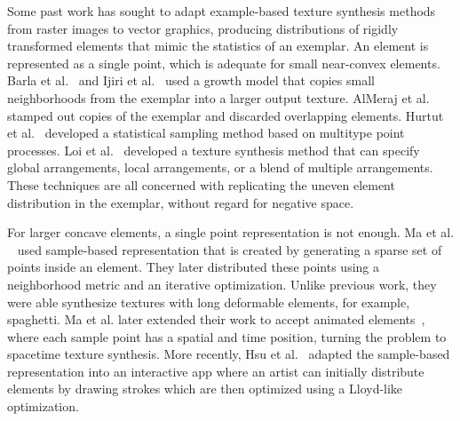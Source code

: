 \newtext
{
Some past work has sought to adapt example-based texture synthesis methods
from raster images to vector graphics, producing distributions of
rigidly transformed elements that mimic the statistics of an exemplar.
An element is represented as a single point, which is adequate for small near-convex elements.
Barla et al.~\cite{Barla2006} and Ijiri et al.~\cite{Ijiri2008} used a growth model that copies small neighborhoods
from the exemplar into a larger output texture.  AlMeraj et al.~\cite{AlMeraj2013}
stamped out copies of the exemplar and discarded overlapping elements.
Hurtut et al.~\cite{Hurtut2009} developed a statistical sampling method based
on multitype point processes.  
Loi et al.~\cite{Loi2017} developed a texture synthesis method that
can specify global arrangements, local arrangements, or a blend of multiple arrangements.
These techniques are all concerned with replicating
the uneven element distribution in the exemplar, without regard for negative space.
}

\newtext
{
For larger concave elements, a single point representation is not enough.
Ma et al. ~\cite{Ma2011} used sample-based representation that
is created by generating a sparse set of points inside an element.
They later distributed these points using a neighborhood metric and an iterative optimization.
Unlike previous work, they were able synthesize textures with long deformable elements, for example, spaghetti.
Ma et al. later extended their work to accept animated elements~\cite{Ma2013}, where
each sample point has a spatial and time position, turning the problem to spacetime texture synthesis.
More recently, Hsu et al.~\cite{Hsu2020} adapted the sample-based representation into an interactive app
where an artist can initially distribute elements by drawing strokes
which are then optimized using a Lloyd-like optimization.
}




